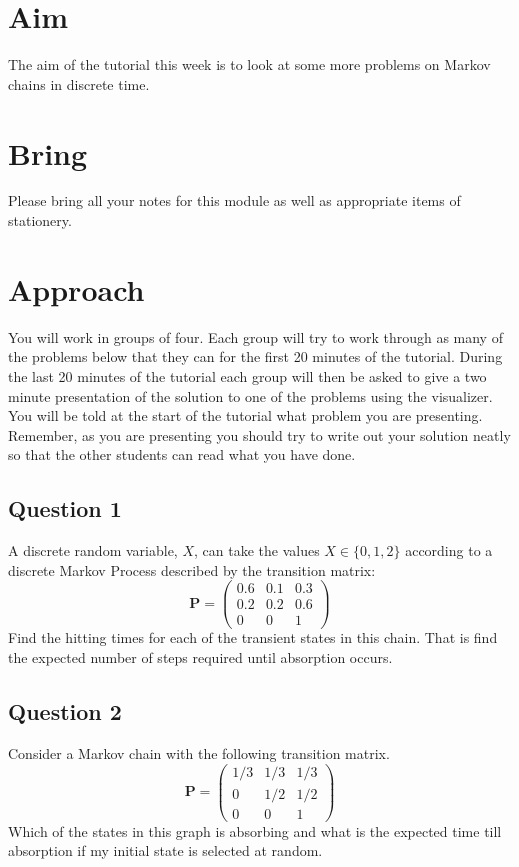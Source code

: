 \documentclass[a4paper]{article}
\begin{document}
\section{Aim}

The aim of the tutorial this week is to look at some more problems on Markov chains in discrete time.

\section{Bring}

Please bring all your notes for this module as well as appropriate items of stationery.

\section{Approach}

You will work in groups of four.  Each group will try to work through as many of the problems below that they can for the first 20 minutes of the tutorial.  During the last 20 minutes of the tutorial 
each group will then be asked to give a two minute presentation of the solution to one of the problems using the visualizer.  You will be told at the start of the tutorial what problem you are 
presenting.  Remember, as you are presenting you should try to write out your solution neatly so that the other students can read what you have done.

\subsection{Question 1}

A discrete random variable, $X$, can take the values $X \in \{0,1,2\}$
according to a discrete Markov Process described by the transition matrix:
$$
\mathbf{P} = \left(
\begin{matrix}
 0.6 & 0.1 & 0.3 \\
 0.2 & 0.2 & 0.6 \\
 0 & 0 & 1
\end{matrix}
\right)
\nonumber
$$
Find the hitting times for each of the transient states in this
chain. That is find the expected number of steps required until absorption
occurs.

\subsection{Question 2}

Consider a Markov chain with the following transition matrix.
$$
\mathbf{P} = \left(
\begin{matrix}
1/3 & 1/3 & 1/3 \\
0 & 1/2 & 1/2 \\
0 & 0 & 1
\end{matrix}
\right)
$$
Which of the states in this graph is
absorbing and what is the expected time till absorption if my initial state is
selected at random.
\end{document}
